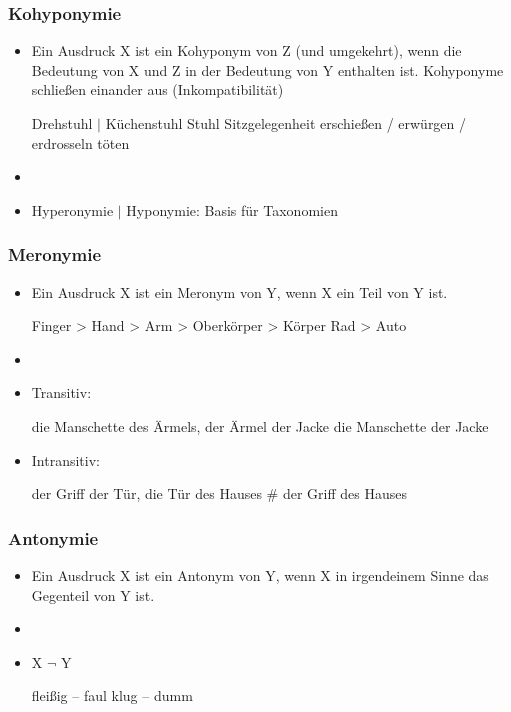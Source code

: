 \begin{frame}
\frametitle{Kohyponymie}

\begin{itemize}
\item
  Ein Ausdruck X ist ein Kohyponym von Z (und umgekehrt), wenn die Bedeutung von X und Z in der Bedeutung von Y enthalten ist. Kohyponyme schließen einander aus (Inkompatibilität)

\eal
\ex Drehstuhl $|$ Küchenstuhl \ras Stuhl \ras Sitzgelegenheit
\ex erschießen / erwürgen / erdrosseln \ras töten
\zl


	\item[]
	\item Hyperonymie $|$ Hyponymie: Basis für Taxonomien

\end{itemize}

\end{frame}



\begin{frame}
\frametitle{Meronymie}

\begin{itemize}
	\item 
Ein Ausdruck X ist ein Meronym von Y, wenn X ein Teil von Y ist.

\vspace{5mm}
	
	\eal
	\ex Finger > Hand > Arm > Oberkörper > Körper
	\ex Rad > Auto
	\zl
	
	\item[]
	\item Transitiv: 
		
	\ea die Manschette des Ärmels, der Ärmel der Jacke \ras die Manschette der Jacke
	\z
		
	\item Intransitiv: 
		
	\ea der Griff der Tür, die Tür des Hauses \ras \# der Griff des Hauses
	\z
		
\end{itemize}

\end{frame}



\begin{frame}
\frametitle{Antonymie}

\begin{itemize}
	\item 
Ein Ausdruck X ist ein Antonym von Y, wenn X in irgendeinem Sinne das Gegenteil von Y ist.
	\item[]	
	\item X \ras $\lnot$ Y
	
	\eal 
		\ex fleißig -- faul
		\ex klug -- dumm
	\zl
	
\end{itemize}

\end{frame}


